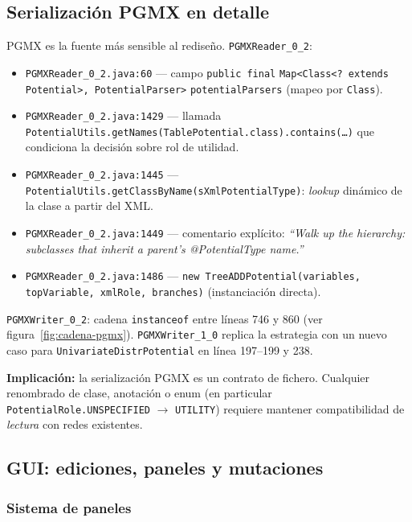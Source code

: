 \documentclass[11pt,a4paper]{article}
\newcommand{\code}[1]{\texttt{#1}}
\newcommand{\warn}[1]{\textcolor{warnorange}{\textbf{#1}}}
\begin{document}
\subsection{Serialización PGMX en detalle}\label{sub:pgmx}

PGMX es la fuente más sensible al rediseño. \code{PGMXReader\_0\_2}:

\begin{itemize}[leftmargin=*,itemsep=2pt]
  \item \code{PGMXReader\_0\_2.java:60} --- campo \code{public final}
        \code{Map<Class<? extends Potential>, PotentialParser>}
        \code{potentialParsers} (mapeo por \code{Class}).
  \item \code{PGMXReader\_0\_2.java:1429} --- llamada
        \code{PotentialUtils.getNames(TablePotential.class).contains(\dots)}
        que condiciona la decisión sobre rol de utilidad.
  \item \code{PGMXReader\_0\_2.java:1445} ---
        \code{PotentialUtils.getClassByName(sXmlPotentialType)}: \emph{lookup}
        dinámico de la clase a partir del XML.
  \item \code{PGMXReader\_0\_2.java:1449} ---
        comentario explícito: \emph{``Walk up the hierarchy: subclasses that
        inherit a parent's @PotentialType name.''}
  \item \code{PGMXReader\_0\_2.java:1486} ---
        \code{new TreeADDPotential(variables, topVariable, xmlRole, branches)}
        (instanciación directa).
\end{itemize}

\code{PGMXWriter\_0\_2}: cadena \code{instanceof} entre líneas 746 y 860 (ver
figura~\ref{fig:cadena-pgmx}). \code{PGMXWriter\_1\_0} replica la estrategia
con un nuevo caso para \code{UnivariateDistrPotential} en línea 197--199 y 238.

\warn{Implicación:} la serialización PGMX es un contrato de fichero. Cualquier
renombrado de clase, anotación o enum (en particular
\code{PotentialRole.UNSPECIFIED} $\to$ \code{UTILITY}) requiere mantener
compatibilidad de \emph{lectura} con redes existentes.

\subsection{GUI: ediciones, paneles y mutaciones}

\subsubsection*{Sistema de paneles}
\end{document}
